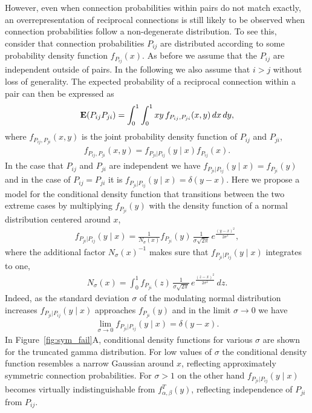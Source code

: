 However, even when connection probabilities within pairs do not match exactly, an overrepresentation of reciprocal connections is still likely to be observed when connection probabilities follow a non-degenerate distribution. To see this, consider that connection probabilities $P_{ij}$ are distributed according to some probability density function $f_{P_{ij}}(x)$. As before we assume that the $P_{ij}$ are independent outside of pairs. In the following we also assume that $i > j$ without loss of generality. The expected probability of a reciprocal connection within a pair can then be expressed as
%
\begin{align}
  \operatorname{\mathbf{E}}(P_{ij}P_{ji}) = \int_0^1 \int_0^1 xy\, f_{P_{ij},P_{ji}}(x,y) \, dx\, dy, \label{eq:dbint}
\end{align}
%
where $f_{P_{ij},P_{ji}}(x,y)$ is the joint probability density function of $P_{ij}$ and $P_{ji}$, 
%
\begin{align}
  f_{P_{ij},P_{ji}}(x,y) =  f_{P_{ji} | P_{ij}}(y \mid x) f_{P_{ij}}(x). \label{eq:cdf_def}
\end{align}
%
In the case that $P_{ij}$ and $P_{ji}$ are independent we have $f_{P_{ji} | P_{ij}}(y \mid x) = f_{P_{ji}}(y)$ and in the case of $P_{ij}=P_{ji}$ it is $f_{P_{ji} | P_{ij}}(y \mid x) = \delta(y-x)$. Here we propose a model for the conditional density function that transitions between the two extreme cases by multiplying $f_{P_{ji}}(y)$ with the density function of a normal distribution centered around $x$,
%
\begin{align}
  f_{P_{ji} | P_{ij}} (y \mid x) = \frac{1}{N_{\sigma}(x)} f_{P_{ji}}(y)\, \frac{1}{\sigma \sqrt{2 \pi}} \,e^{\frac{(y-x)^2}{2 \sigma^2}} \label{eq:fpijpji},
\end{align}
%
where the additional factor $N_{\sigma}(x)^{-1}$  makes sure that $f_{P_{ji}|P_{ij}} (y \mid x)$ integrates to one,
%
\begin{align}
  N_{\sigma}(x) = \int_0^1 f_{P_{ji}}(z)\, \frac{1}{\sigma \sqrt{2 \pi}}\, e^{\frac{(z-x)^2}{2 \sigma^2}} \,dz.
\end{align}
%
Indeed, as the standard deviation $\sigma$ of the modulating normal distribution increases $f_{P_{ji}|P_{ij}} (y \mid x)$ approaches $f_{P_{ji}}(y)$ and in the limit $\sigma \to 0$ we have
\begin{align}
  \lim_{\sigma \to 0}   f_{P_{ji}|P_{ij}} (y \mid x) = \delta(y-x).
\end{align}
%
In Figure~\ref{fig:sym_fail}A, conditional density functions for various $\sigma$ are shown for the truncated gamma distribution. For low values of $\sigma$ the conditional density function resembles a narrow Gaussian around $x$, reflecting approximately symmetric connection probabilities. For $\sigma > 1$ on the other hand $f_{P_{ji} | P_{ij}}(y \mid x)$ becomes virtually indistinguishable from $f^T_{\alpha, \beta}(y)$, reflecting independence of $P_{ji}$ from $P_{ij}$.

